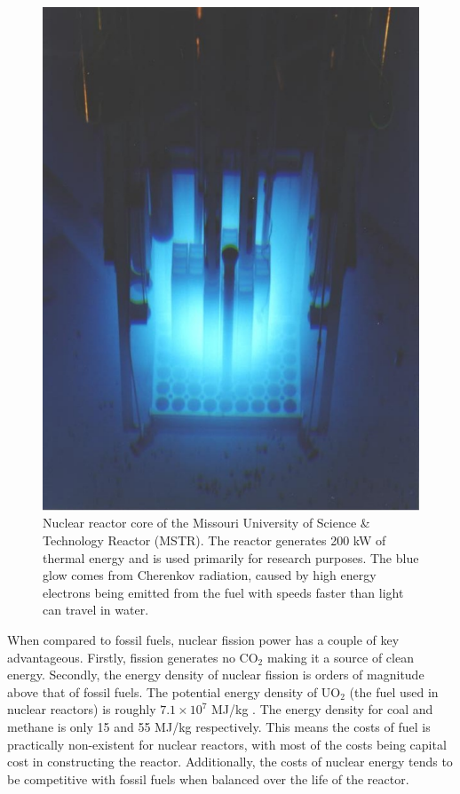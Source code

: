 		\begin{figure}[h!]
			\centering
			\includegraphics[scale=0.7]{Figures/mstr.pdf}
			\caption[Missouri University of Science \& Technology Nuclear Reactor Core]{Nuclear reactor core of the Missouri University of Science \& Technology Reactor (MSTR). The reactor generates 200 kW of thermal energy and is used primarily for research purposes. The blue glow comes from Cherenkov radiation, caused by high energy electrons being emitted from the fuel with speeds faster than light can travel in water. \cite{tamm1937coherent, Image_MSTR}}
		\end{figure}
		
		When compared to fossil fuels, nuclear fission power has a couple of key advantageous. Firstly, fission generates no CO$_2$ making it a source of clean energy. \cite{bibid} Secondly, the energy density of nuclear fission is orders of magnitude above that of fossil fuels. The potential energy density of UO$_2$ (the fuel used in nuclear reactors) is roughly $7.1\times10^7$ MJ/kg \cite{bibid}. The energy density for coal and methane is only 15 and 55 MJ/kg respectively. \cite{bibid} This means the costs of fuel is practically non-existent for nuclear reactors, with most of the costs being capital cost in constructing the reactor. \cite{bibid} Additionally, the costs of nuclear energy tends to be competitive with fossil fuels when balanced over the life of the reactor. \cite{bibid}
		
